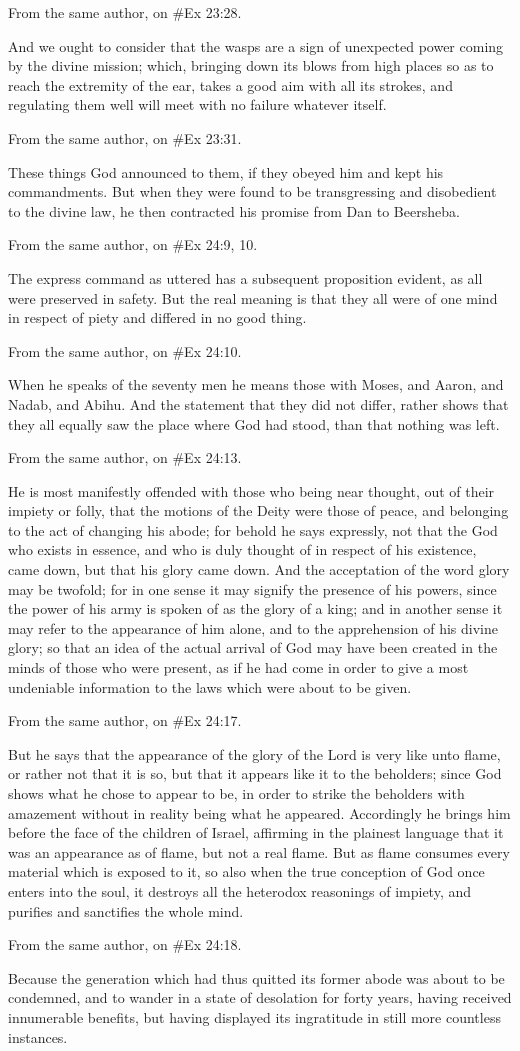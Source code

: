 From the same author, on \#Ex 23:28.

And we ought to consider that the wasps are a sign of unexpected power coming by the divine
mission; which, bringing down its blows from high places so as to reach the extremity of the ear,
takes a good aim with all its strokes, and regulating them well will meet with no failure whatever
itself.

From the same author, on \#Ex 23:31.

These things God announced to them, if they obeyed him and kept his commandments. But when
they were found to be transgressing and disobedient to the divine law, he then contracted his
promise from Dan to Beersheba.

From the same author, on \#Ex 24:9, 10.

The express command as uttered has a subsequent proposition evident, as all were preserved in
safety. But the real meaning is that they all were of one mind in respect of piety and differed in no
good thing.

From the same author, on \#Ex 24:10.

When he speaks of the seventy men he means those with Moses, and Aaron, and Nadab, and
Abihu. And the statement that they did not differ, rather shows that they all equally saw the place
where God had stood, than that nothing was left.

From the same author, on \#Ex 24:13.

He is most manifestly offended with those who being near thought, out of their impiety or folly, that
the motions of the Deity were those of peace, and belonging to the act of changing his abode; for
behold he says expressly, not that the God who exists in essence, and who is duly thought of in
respect of his existence, came down, but that his glory came down. And the acceptation of the
word glory may be twofold; for in one sense it may signify the presence of his powers, since the
power of his army is spoken of as the glory of a king; and in another sense it may refer to the
appearance of him alone, and to the apprehension of his divine glory; so that an idea of the actual
arrival of God may have been created in the minds of those who were present, as if he had come
in order to give a most undeniable information to the laws which were about to be given.

From the same author, on \#Ex 24:17.

But he says that the appearance of the glory of the Lord is very like unto flame, or rather not that it
is so, but that it appears like it to the beholders; since God shows what he chose to appear to be,
in order to strike the beholders with amazement without in reality being what he appeared.
Accordingly he brings him before the face of the children of Israel, affirming in the plainest
language that it was an appearance as of flame, but not a real flame. But as flame consumes
every material which is exposed to it, so also when the true conception of God once enters into the
soul, it destroys all the heterodox reasonings of impiety, and purifies and sanctifies the whole mind.

From the same author, on \#Ex 24:18.

Because the generation which had thus quitted its former abode was about to be condemned, and
to wander in a state of desolation for forty years, having received innumerable benefits, but having
displayed its ingratitude in still more countless instances.
